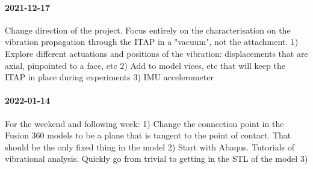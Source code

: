 \paragraph{2021-12-17}
Change direction of the project. Focus entirely on the characterisation on the vibration propagation through the ITAP in a "vacuum", not the attachment.
1) Explore different actuations and positions of the vibration: displacements that are axial, pinpointed to a face, etc
2) Add to model vices, etc that will keep the ITAP in place during experiments
3) IMU accelerometer

\paragraph{2022-01-14}
For the weekend and following week:
1) Change the connection point in the Fusion 360 models to be a plane that is tangent to the point of contact. That should be the only fixed thing in the model
2) Start with Abaqus. Tutorials of vibrational analysis. Quickly go from trivial to getting in the STL of the model
3) 